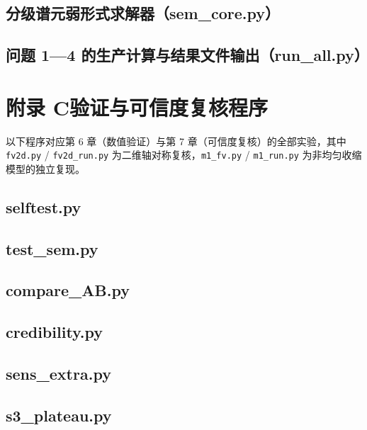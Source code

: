 \documentclass[12pt,a4paper]{ctexart}
\begin{document}
\subsection*{分级谱元弱形式求解器（sem\_core.py）}


\subsection*{问题 1—4 的生产计算与结果文件输出（run\_all.py）}


\newpage
\section*{附录 C\quad 验证与可信度复核程序}

以下程序对应第 6 章（数值验证）与第 7 章（可信度复核）的全部实验，其中 \texttt{fv2d.py} / \texttt{fv2d\_run.py} 为二维轴对称复核，\texttt{m1\_fv.py} / \texttt{m1\_run.py} 为非均匀收缩模型的独立复现。

\subsection*{selftest.py}


\subsection*{test\_sem.py}


\subsection*{compare\_AB.py}


\subsection*{credibility.py}


\subsection*{sens\_extra.py}


\subsection*{s3\_plateau.py}

\end{document}
